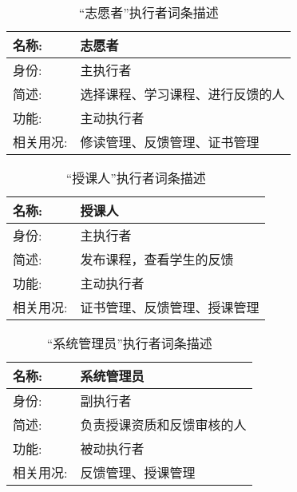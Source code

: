 
\begin{table}[H]  
\caption{“志愿者”执行者词条描述}  
\begin{center}  
    \begin{tabular}{l p{11cm}} 
        \hline
        \quad 名称:  &   志愿者 \\
        \hline
        \quad 身份:  & 主执行者 \\
        \hline
        \quad 简述:  & 选择课程、学习课程、进行反馈的人 \\
        \hline
        \quad 功能:  & 主动执行者 \\
        \hline
        \quad 相关用况:  & 修读管理、反馈管理、证书管理 \\
        \hline
    \end{tabular}
\end{center}
\end{table}

\begin{table}[H]  
\caption{“授课人”执行者词条描述}  
\begin{center}  
    \begin{tabular}{l p{11cm}} 
        \hline
        \quad 名称:  &   授课人 \\
        \hline
        \quad 身份:  & 主执行者 \\
        \hline
        \quad 简述:  & 发布课程，查看学生的反馈 \\
        \hline
        \quad 功能:  & 主动执行者 \\
        \hline
        \quad 相关用况:  & 证书管理、反馈管理、授课管理 \\
        \hline
    \end{tabular}
\end{center}
\end{table}

\begin{table}[H]  
\caption{“系统管理员”执行者词条描述}  
\begin{center}  
    \begin{tabular}{l p{11cm}} 
        \hline
        \quad 名称:  &  系统管理员 \\
        \hline
        \quad 身份:  & 副执行者 \\
        \hline
        \quad 简述:  & 负责授课资质和反馈审核的人 \\
        \hline
        \quad 功能:  & 被动执行者 \\
        \hline
        \quad 相关用况:  & 反馈管理、授课管理 \\
        \hline
    \end{tabular}
\end{center}
\end{table}

